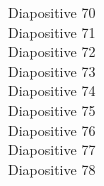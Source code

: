 \documentclass[french]{article}
\begin{document}

Diapositive 70 \\


Diapositive 71 \\


Diapositive 72 \\


Diapositive 73 \\


Diapositive 74 \\


Diapositive 75 \\


Diapositive 76 \\


Diapositive 77 \\


Diapositive 78
\end{document}

